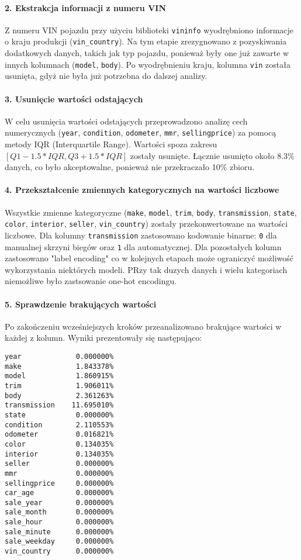 \documentclass[10pt,letterpaper]{article}
\begin{document}
\paragraph{2. Ekstrakcja informacji z numeru VIN}
Z numeru VIN pojazdu przy użyciu biblioteki \texttt{vininfo} wyodrębniono informacje o kraju produkcji (\texttt{vin\_country}). Na tym etapie zrezygnowano z pozyskiwania dodatkowych danych, takich jak typ pojazdu, ponieważ były one już zawarte w innych kolumnach (\texttt{model}, \texttt{body}). Po wyodrębnieniu kraju, kolumna \texttt{vin} została usunięta, gdyż nie była już potrzebna do dalszej analizy.

\paragraph{3. Usunięcie wartości odstających}
W celu usunięcia wartości odstających przeprowadzono analizę cech numerycznych (\texttt{year}, \texttt{condition}, \texttt{odometer}, \texttt{mmr}, \texttt{sellingprice}) za pomocą metody IQR (Interquartile Range). Wartości spoza zakresu $[Q1 - 1.5 * IQR, Q3 + 1.5 * IQR]$ zostały usunięte. Łącznie usunięto około 8.3\% danych, co było akceptowalne, ponieważ nie przekraczało 10\% zbioru.

\paragraph{4. Przekształcenie zmiennych kategorycznych na wartości liczbowe}
Wszystkie zmienne kategoryczne (\texttt{make}, \texttt{model}, \texttt{trim}, \texttt{body}, \texttt{transmission}, \texttt{state}, \texttt{color}, \texttt{interior}, \texttt{seller}, \texttt{vin\_country}) zostały przekonwertowane na wartości liczbowe. Dla kolumny \texttt{transmission} zastosowano kodowanie binarne: \texttt{0} dla manualnej skrzyni biegów oraz \texttt{1} dla automatycznej. Dla pozostałych kolumn zastosowano "label encoding" co w kolejnych etapach może ograniczyć możliwość wykorzystania niektórych modeli. PRzy tak duzych danych i wielu kategoriach niemożliwe było zastsowanie one-hot encodingu.

\paragraph{5. Sprawdzenie brakujących wartości}
Po zakończeniu wcześniejszych kroków przeanalizowano brakujące wartości w każdej z kolumn. Wyniki prezentowały się następująco:

\begin{verbatim}
year             0.000000%
make             1.843378%
model            1.860915%
trim             1.906011%
body             2.361263%
transmission    11.695010%
state            0.000000%
condition        2.110553%
odometer         0.016821%
color            0.134035%
interior         0.134035%
seller           0.000000%
mmr              0.000000%
sellingprice     0.000000%
car_age          0.000000%
sale_year        0.000000%
sale_month       0.000000%
sale_hour        0.000000%
sale_minute      0.000000%
sale_weekday     0.000000%
vin_country      0.000000%
\end{verbatim}
\end{document}
